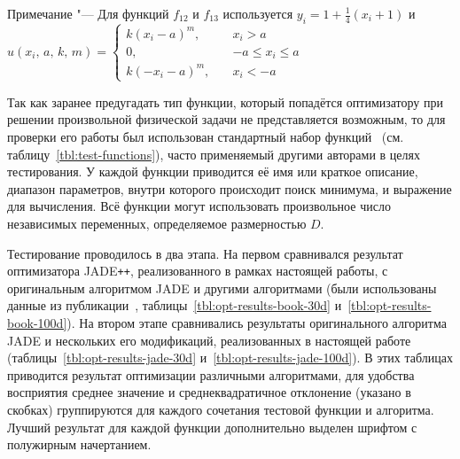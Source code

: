 \begin{longtabu}
{            \hspace*{2.5em}%
            Примечание "---  Для функций $f_{12}$ и $f_{13}$
            используется $y_i = 1 + \frac{1}{4}(x_i+1)$ и
            $u(x_i,\,a,\,k,\,m)=\begin{cases}
k(x_i-a)^m,\quad &x_i >a\\[-0.5em]
0,\quad &-a\leq x_i \leq a\\[-0.5em]
k(-x_i-a)^m,\quad &x_i <-a
\end{cases}$  }   \\        \bottomrule %
\end{longtabu} \endgroup

Так как заранее предугадать тип функции, который попадётся
оптимизатору при решении произвольной физической задачи не
представляется возможным, то для проверки его работы был использован
стандартный набор
функций~\cite{Schwefel-1981,Rosenbrock-1960,Muhlenbein-1991,back-1996,Griewank-1981}
(см. таблицу~\ref{tbl:test-functions}), часто применяемый другими
авторами в целях тестирования. У каждой функции приводится её имя или
краткое описание, диапазон параметров, внутри которого происходит
поиск минимума, и выражение для вычисления. Всё функции могут
использовать произвольное число независимых переменных, определяемое
размерностью $D$.

Тестирование проводилось в два этапа. На первом сравнивался результат
оптимизатора JADE\texttt{++}, реализованного в рамках настоящей
работы, с оригинальным алгоритмом JADE и другими алгоритмами (были
использованы данные из публикации~\cite{Jingqiao-JADE-2009},
таблицы~\ref{tbl:opt-results-book-30d}
и~\ref{tbl:opt-results-book-100d}). На втором этапе сравнивались
результаты оригинального алгоритма JADE и нескольких его модификаций,
реализованных в настоящей работе
(таблицы~\ref{tbl:opt-results-jade-30d}
и~\ref{tbl:opt-results-jade-100d}).  В этих таблицах приводится
результат оптимизации различными алгоритмами, для удобства восприятия
среднее значение и среднеквадратичное отклонение (указано в скобках)
группируются для каждого сочетания тестовой функции и
алгоритма. Лучший результат для каждой функции дополнительно выделен
шрифтом с полужирным начертанием.

\begingroup %
\newcommand\z{\bfseries}
\renewcommand\altshape{\ifthenelse{\therowcnt = 0 }{%
}{
  \ifnumodd{\value{rowcnt}}{}{\vspace*{-0.8ex}}}
}
\newcolumntype{A}{ >{\altshape}X[1mc]}

